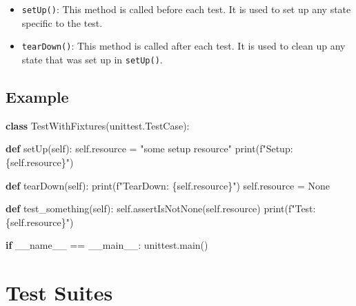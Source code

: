 \documentclass[
  letterpaper,
  DIV=11,
  numbers=noendperiod]{scrreprt}
\newenvironment{Shaded}{\begin{snugshade}}{\end{snugshade}}
\newcommand{\BuiltInTok}[1]{\textcolor[rgb]{0.00,0.23,0.31}{#1}}
\newcommand{\ControlFlowTok}[1]{\textcolor[rgb]{0.00,0.23,0.31}{\textbf{#1}}}
\newcommand{\KeywordTok}[1]{\textcolor[rgb]{0.00,0.23,0.31}{\textbf{#1}}}
\newcommand{\NormalTok}[1]{\textcolor[rgb]{0.00,0.23,0.31}{#1}}
\newcommand{\OperatorTok}[1]{\textcolor[rgb]{0.37,0.37,0.37}{#1}}
\newcommand{\SpecialCharTok}[1]{\textcolor[rgb]{0.37,0.37,0.37}{#1}}
\newcommand{\SpecialStringTok}[1]{\textcolor[rgb]{0.13,0.47,0.30}{#1}}
\newcommand{\StringTok}[1]{\textcolor[rgb]{0.13,0.47,0.30}{#1}}
\newcommand{\VariableTok}[1]{\textcolor[rgb]{0.07,0.07,0.07}{#1}}
\providecommand{\tightlist}{%
  \setlength{\itemsep}{0pt}\setlength{\parskip}{0pt}}\usepackage{longtable,booktabs,array}
\begin{document}
\begin{itemize}
\tightlist
\item
  \texttt{setUp()}: This method is called before each test. It is used
  to set up any state specific to the test.
\item
  \texttt{tearDown()}: This method is called after each test. It is used
  to clean up any state that was set up in \texttt{setUp()}.
\end{itemize}

\subsection{Example}\label{example-12}

\begin{Shaded}
\begin{Highlighting}[]
\KeywordTok{class}\NormalTok{ TestWithFixtures(unittest.TestCase):}

    \KeywordTok{def}\NormalTok{ setUp(}\VariableTok{self}\NormalTok{):}
        \VariableTok{self}\NormalTok{.resource }\OperatorTok{=} \StringTok{"some setup resource"}
        \BuiltInTok{print}\NormalTok{(}\SpecialStringTok{f"Setup: }\SpecialCharTok{\{}\VariableTok{self}\SpecialCharTok{.}\NormalTok{resource}\SpecialCharTok{\}}\SpecialStringTok{"}\NormalTok{)}

    \KeywordTok{def}\NormalTok{ tearDown(}\VariableTok{self}\NormalTok{):}
        \BuiltInTok{print}\NormalTok{(}\SpecialStringTok{f"TearDown: }\SpecialCharTok{\{}\VariableTok{self}\SpecialCharTok{.}\NormalTok{resource}\SpecialCharTok{\}}\SpecialStringTok{"}\NormalTok{)}
        \VariableTok{self}\NormalTok{.resource }\OperatorTok{=} \VariableTok{None}

    \KeywordTok{def}\NormalTok{ test\_something(}\VariableTok{self}\NormalTok{):}
        \VariableTok{self}\NormalTok{.assertIsNotNone(}\VariableTok{self}\NormalTok{.resource)}
        \BuiltInTok{print}\NormalTok{(}\SpecialStringTok{f"Test: }\SpecialCharTok{\{}\VariableTok{self}\SpecialCharTok{.}\NormalTok{resource}\SpecialCharTok{\}}\SpecialStringTok{"}\NormalTok{)}

\ControlFlowTok{if} \VariableTok{\_\_name\_\_} \OperatorTok{==} \StringTok{\textquotesingle{}\_\_main\_\_\textquotesingle{}}\NormalTok{:}
\NormalTok{    unittest.main()}
\end{Highlighting}
\end{Shaded}

\section{Test Suites}\label{test-suites}
\end{document}
